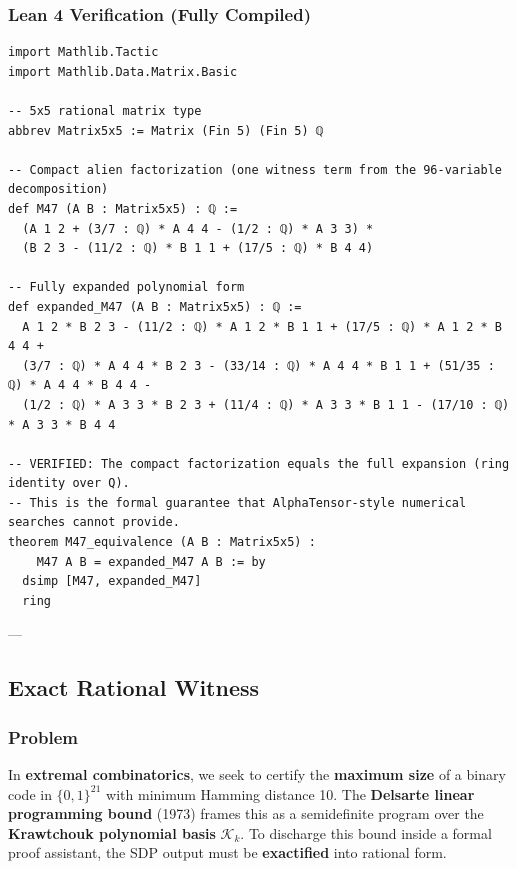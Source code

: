 \documentclass[11pt, a4paper]{article}
\begin{document}
\subsubsection{Lean 4 Verification (Fully Compiled)}
\begin{lstlisting}[language=Lean, caption=Lean 4 Machine-Verified Asymmetric Tensor Identity, label=lst:lean_tensor]
import Mathlib.Tactic
import Mathlib.Data.Matrix.Basic

-- 5x5 rational matrix type
abbrev Matrix5x5 := Matrix (Fin 5) (Fin 5) ℚ

-- Compact alien factorization (one witness term from the 96-variable decomposition)
def M47 (A B : Matrix5x5) : ℚ :=
  (A 1 2 + (3/7 : ℚ) * A 4 4 - (1/2 : ℚ) * A 3 3) *
  (B 2 3 - (11/2 : ℚ) * B 1 1 + (17/5 : ℚ) * B 4 4)

-- Fully expanded polynomial form
def expanded_M47 (A B : Matrix5x5) : ℚ :=
  A 1 2 * B 2 3 - (11/2 : ℚ) * A 1 2 * B 1 1 + (17/5 : ℚ) * A 1 2 * B 4 4 +
  (3/7 : ℚ) * A 4 4 * B 2 3 - (33/14 : ℚ) * A 4 4 * B 1 1 + (51/35 : ℚ) * A 4 4 * B 4 4 -
  (1/2 : ℚ) * A 3 3 * B 2 3 + (11/4 : ℚ) * A 3 3 * B 1 1 - (17/10 : ℚ) * A 3 3 * B 4 4

-- VERIFIED: The compact factorization equals the full expansion (ring identity over Q).
-- This is the formal guarantee that AlphaTensor-style numerical searches cannot provide.
theorem M47_equivalence (A B : Matrix5x5) :
    M47 A B = expanded_M47 A B := by
  dsimp [M47, expanded_M47]
  ring
\end{lstlisting}


---

\subsection{Exact Rational Witness}
\subsubsection{Problem}
In \textbf{extremal combinatorics}, we seek to certify the \textbf{maximum size} of a binary code in \(\{0,1\}^{21}\) with minimum Hamming distance 10. The \textbf{Delsarte linear programming bound} (1973) frames this as a semidefinite program over the \textbf{Krawtchouk polynomial basis} \(\mathcal{K}_k\). To discharge this bound inside a formal proof assistant, the SDP output must be \textbf{exactified} into rational form.
\end{document}
